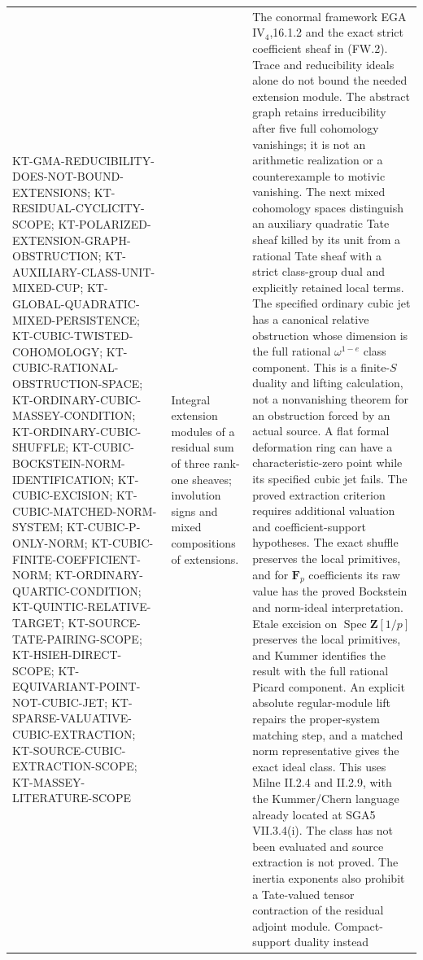 \begin{longtable}{>{\raggedright\arraybackslash}p{}
>{\raggedright\arraybackslash}p{}
>{\raggedright\arraybackslash}p{}}
KT-GMA-REDUCIBILITY-DOES-NOT-BOUND-EXTENSIONS;
KT-RESIDUAL-CYCLICITY-SCOPE;
KT-POLARIZED-EXTENSION-GRAPH-OBSTRUCTION;
KT-AUXILIARY-CLASS-UNIT-MIXED-CUP;
KT-GLOBAL-QUADRATIC-MIXED-PERSISTENCE;
KT-CUBIC-TWISTED-COHOMOLOGY;
KT-CUBIC-RATIONAL-OBSTRUCTION-SPACE;
KT-ORDINARY-CUBIC-MASSEY-CONDITION;
KT-ORDINARY-CUBIC-SHUFFLE;
KT-CUBIC-BOCKSTEIN-NORM-IDENTIFICATION;
KT-CUBIC-EXCISION; KT-CUBIC-MATCHED-NORM-SYSTEM;
KT-CUBIC-P-ONLY-NORM;
KT-CUBIC-FINITE-COEFFICIENT-NORM;
KT-ORDINARY-QUARTIC-CONDITION; KT-QUINTIC-RELATIVE-TARGET;
KT-SOURCE-TATE-PAIRING-SCOPE;
KT-HSIEH-DIRECT-SCOPE;
KT-EQUIVARIANT-POINT-NOT-CUBIC-JET;
KT-SPARSE-VALUATIVE-CUBIC-EXTRACTION;
KT-SOURCE-CUBIC-EXTRACTION-SCOPE;
KT-MASSEY-LITERATURE-SCOPE &
Integral extension modules of a residual sum of three
rank-one sheaves; involution signs and mixed compositions
of extensions. &
The conormal framework EGA IV$_4$,16.1.2 and the exact
strict coefficient sheaf in (FW.2). Trace and reducibility
ideals alone do not bound the needed extension module.
The abstract graph retains irreducibility after five full
cohomology vanishings; it is not an arithmetic realization
or a counterexample to motivic vanishing. The next mixed
cohomology spaces distinguish an auxiliary quadratic Tate
sheaf killed by its unit from a rational Tate sheaf with
a strict class-group dual and explicitly retained local terms.
The specified ordinary cubic jet has a canonical relative
obstruction whose dimension is the full rational
$\omega^{1-e}$ class component. This is a finite-$S$
duality and lifting calculation, not a nonvanishing theorem
for an obstruction forced by an actual source. A flat formal
deformation ring can have a characteristic-zero point while
its specified cubic jet fails. The proved extraction criterion
requires additional valuation and coefficient-support hypotheses.
The exact shuffle preserves the local primitives, and for
$\mathbf F_p$ coefficients its raw value has the proved
Bockstein and norm-ideal interpretation. Etale excision on
$\operatorname{Spec}\mathbf Z[1/p]$ preserves the local primitives,
and Kummer identifies the result with the full rational Picard
component. An explicit absolute regular-module lift repairs the
proper-system matching step, and a matched norm representative
gives the exact ideal class. This uses Milne II.2.4 and II.2.9,
with the Kummer/Chern language already located at SGA5 VII.3.4(i).
The class has not been evaluated and source extraction is not proved.
The inertia exponents also prohibit a Tate-valued tensor contraction
of the residual adjoint module. Compact-support duality instead

\end{longtable}
